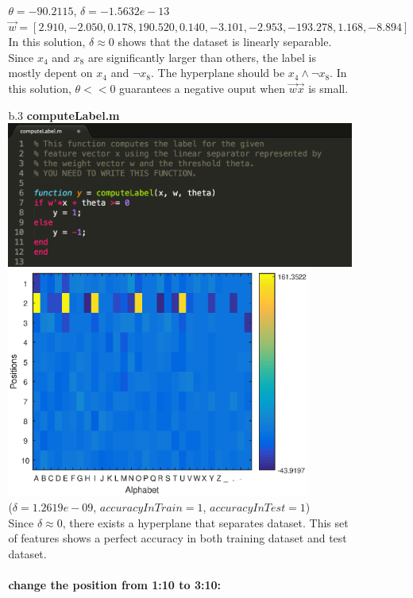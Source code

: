 \begin{enumerate}
\begin{enumerate}
\begin{enumerate}
			$\theta=-90.2115$, $\delta = -1.5632e-13$\\
			$\vec{w} = [2.910,-2.050,0.178,190.520,0.140,-3.101,-2.953,-193.278,1.168,-8.894]$\\
			In this solution, $\delta \approx 0$ shows that the dataset is linearly separable. Since $x_4$ and $x_8$ are significantly larger than others, the label is mostly depent on $x_4$ and $\neg x_8$. The hyperplane should be $x_4 \land \neg x_8$. In this solution, $\theta << 0$ guarantees a negative ouput when $\vec{w} \vec{x}$ is small.\\
			\item[b.3] \textbf{computeLabel.m}\\
			\includegraphics[width=13cm]{code_4}\\
			\includegraphics[width=10cm]{figure_3}\\
			($\delta=1.2619e-09$, $accuracyInTrain = 1$, $accuracyInTest = 1$)\\
			Since $\delta \approx 0$, there exists a hyperplane that separates dataset. This set of features shows a perfect accuracy in both training dataset and test dataset.\\\\
			\textbf{change the position from 1:10 to 3:10:}\\

\end{enumerate}
\end{enumerate}
\end{enumerate}
